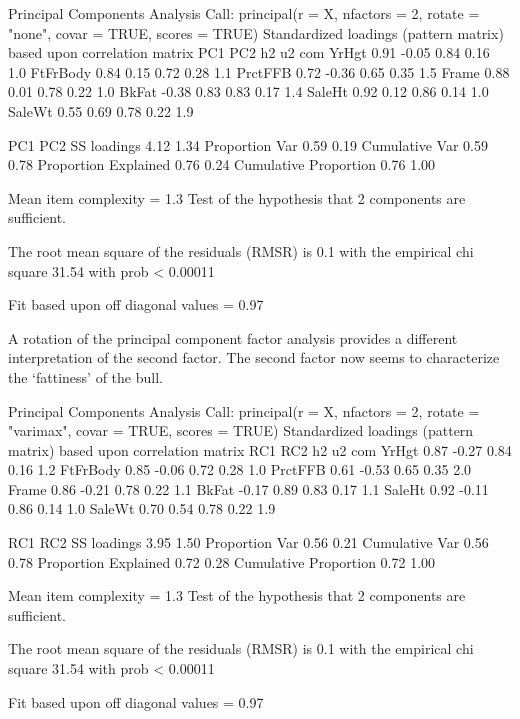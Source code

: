 \begin{rc}

Principal Components Analysis
Call: principal(r = X, nfactors = 2, rotate = "none", covar = TRUE, 
    scores = TRUE)
Standardized loadings (pattern matrix) based upon correlation matrix
           PC1   PC2   h2   u2 com
YrHgt     0.91 -0.05 0.84 0.16 1.0
FtFrBody  0.84  0.15 0.72 0.28 1.1
PrctFFB   0.72 -0.36 0.65 0.35 1.5
Frame     0.88  0.01 0.78 0.22 1.0
BkFat    -0.38  0.83 0.83 0.17 1.4
SaleHt    0.92  0.12 0.86 0.14 1.0
SaleWt    0.55  0.69 0.78 0.22 1.9

                       PC1  PC2
SS loadings           4.12 1.34
Proportion Var        0.59 0.19
Cumulative Var        0.59 0.78
Proportion Explained  0.76 0.24
Cumulative Proportion 0.76 1.00

Mean item complexity =  1.3
Test of the hypothesis that 2 components are sufficient.

The root mean square of the residuals (RMSR) is  0.1 
 with the empirical chi square  31.54  with prob <  0.00011 

Fit based upon off diagonal values = 0.97

\end{rc}

A rotation of the principal component factor analysis provides a different interpretation of the second factor. The second factor now seems to characterize the `fattiness' of the bull.

\begin{rc}

Principal Components Analysis
Call: principal(r = X, nfactors = 2, rotate = "varimax", covar = TRUE, 
    scores = TRUE)
Standardized loadings (pattern matrix) based upon correlation matrix
           RC1   RC2   h2   u2 com
YrHgt     0.87 -0.27 0.84 0.16 1.2
FtFrBody  0.85 -0.06 0.72 0.28 1.0
PrctFFB   0.61 -0.53 0.65 0.35 2.0
Frame     0.86 -0.21 0.78 0.22 1.1
BkFat    -0.17  0.89 0.83 0.17 1.1
SaleHt    0.92 -0.11 0.86 0.14 1.0
SaleWt    0.70  0.54 0.78 0.22 1.9

                       RC1  RC2
SS loadings           3.95 1.50
Proportion Var        0.56 0.21
Cumulative Var        0.56 0.78
Proportion Explained  0.72 0.28
Cumulative Proportion 0.72 1.00

Mean item complexity =  1.3
Test of the hypothesis that 2 components are sufficient.

The root mean square of the residuals (RMSR) is  0.1 
 with the empirical chi square  31.54  with prob <  0.00011 

Fit based upon off diagonal values = 0.97

\end{rc}

